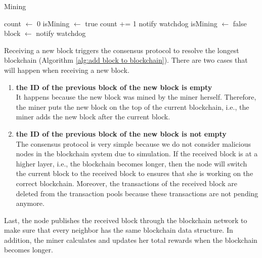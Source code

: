 \begin{algorithm}[htb]
    \caption{Mining}
    \label{alg:mining}
\begin{algorithmic}[1]
    \State count $\gets$ 0
    \State isMining $\gets$ true
    \State
    \Repeat 
    \State count += 1
    \State notify watchdog
    \State
    \State isMining $\gets$ false
    \State block $\gets$ 
    \State {}
    \State notify watchdog
    \EndProcedure
\end{algorithmic}
\end{algorithm}
\vspace*{\fill}

\clearpage

Receiving a new block triggers the consensus protocol to resolve the longest blockchain (Algorithm \ref{alg:add block to blockchain}). There are two cases that will happen when receiving a new block.

\begin{enumerate}
    \item \textbf{the ID of the previous block of the new block is empty} \\
        It happens because the new block was mined by the miner herself. Therefore, the miner puts the new block on the top of the current blockchain, i.e., the miner adds the new block after the current block.
    \item \textbf{the ID of the previous block of the new block is not empty} \\
        The consensus protocol is very simple because we do not consider malicious nodes in the blockchain system due to simulation. If the received block is at a higher layer, i.e., the blockchain becomes longer, then the node will switch the current block to the received block to ensures that she is working on the correct blockchain. Moreover, the transactions of the received block are deleted from the transaction pools because these transactions are not pending anymore.
\end{enumerate}

Last, the node publishes the received block through the blockchain network to make sure that every neighbor has the same blockchain data structure. In addition, the miner calculates and updates her total rewards when the blockchain becomes longer.

